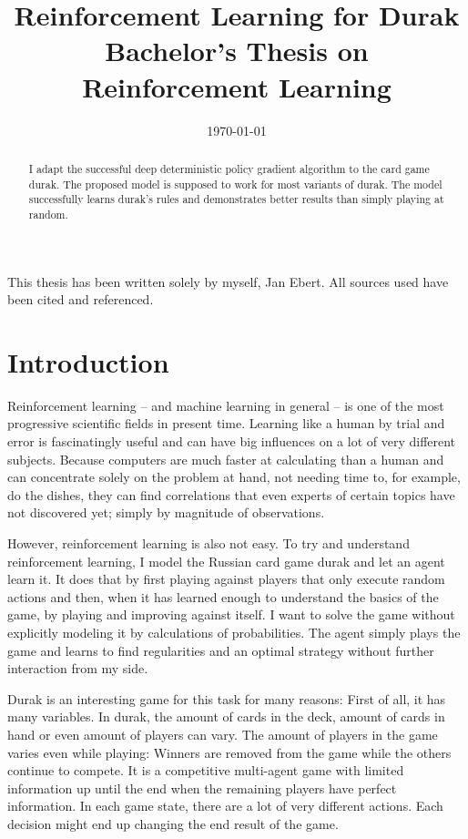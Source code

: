 \documentclass[a4paper,titlepage]{article}
\title{Reinforcement Learning for Durak \\ \medskip \large{Bachelor's Thesis on Reinforcement Learning}}
\date{\today}
\begin{document}
\maketitle

\setcounter{page}{2}
\thispagestyle{empty}
\noindent
This thesis has been written solely by myself, Jan Ebert. All sources used have been cited and referenced.

\begin{abstract}
\setcounter{page}{3}
I adapt the successful deep deterministic policy gradient algorithm to the card game durak. The proposed model is supposed to work for most variants of durak. The model successfully learns durak's rules and demonstrates better results than simply playing at random.
\end{abstract}

\setcounter{page}{4}
\thispagestyle{empty}
\tableofcontents

\newpage


\section{Introduction}

Reinforcement learning -- and machine learning in general -- is one of the most progressive scientific fields in present time. Learning like a human by trial and error is fascinatingly useful and can have big influences on a lot of very different subjects. Because computers are much faster at calculating than a human and can concentrate solely on the problem at hand, not needing time to, for example, do the dishes, they can find correlations that even experts of certain topics have not discovered yet; simply by magnitude of observations.

However, reinforcement learning is also not easy. To try and understand reinforcement learning, I model the Russian card game durak and let an agent learn it. It does that by first playing against players that only execute random actions and then, when it has learned enough to understand the basics of the game, by playing and improving against itself. I want to solve the game without explicitly modeling it by calculations of probabilities. The agent simply plays the game and learns to find regularities and an optimal strategy without further interaction from my side.

Durak is an interesting game for this task for many reasons: First of all, it has many variables. In durak, the amount of cards in the deck, amount of cards in hand or even amount of players can vary. The amount of players in the game varies even while playing: Winners are removed from the game while the others continue to compete. It is a competitive multi-agent game with limited information up until the end when the remaining players have perfect information. In each game state, there are a lot of very different actions. Each decision might end up changing the end result of the game.
\end{document}

